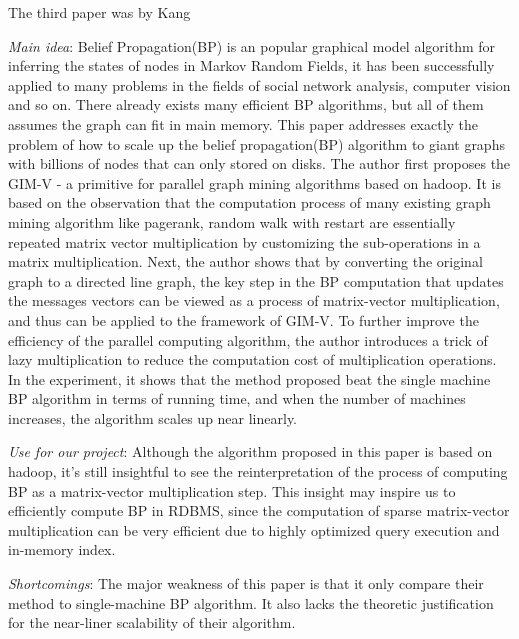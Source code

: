 The third paper was by Kang
\cite{kang2010inference}
\begin{itemize*}
\item {\em Main idea}:  
		Belief Propagation(BP) is an popular graphical model algorithm for inferring the states of nodes in Markov Random Fields, it has been successfully applied to many problems in the fields of social network analysis, computer vision and so on. There already exists many efficient BP algorithms, but all of them assumes the graph can fit in main memory. This paper addresses exactly the problem of how to scale up the belief propagation(BP) algorithm to giant graphs with billions of nodes that can only stored on disks. The author first proposes the GIM-V - a primitive for parallel graph mining algorithms based on hadoop. It is based on the observation that the computation process of many existing graph mining algorithm like pagerank, random walk with restart are essentially repeated matrix vector multiplication by customizing the sub-operations in a matrix multiplication. Next, the author shows that by converting the original graph to a directed line graph, the key step in the BP computation that updates the messages vectors can be viewed as a process of matrix-vector multiplication, and thus can be applied to the framework of GIM-V. To further improve the efficiency of the parallel computing algorithm, the author introduces a trick of lazy multiplication to reduce the computation cost of multiplication operations. In the experiment, it shows that the method proposed beat the single machine BP algorithm in terms of running time, and when the number of machines increases, the algorithm scales up near linearly.

\item {\em Use for our project}:
       Although the algorithm proposed in this paper is based on hadoop, it's still insightful to see the reinterpretation of the process of computing BP as a matrix-vector multiplication step. This insight may inspire us to efficiently compute BP in RDBMS, since the computation of sparse matrix-vector multiplication can be very efficient due to highly optimized query execution and in-memory index.
\item {\em Shortcomings}:
		The major weakness of this paper is that it only compare their method to single-machine BP algorithm. It also lacks the theoretic justification for the near-liner scalability of their algorithm.
\end{itemize*}
